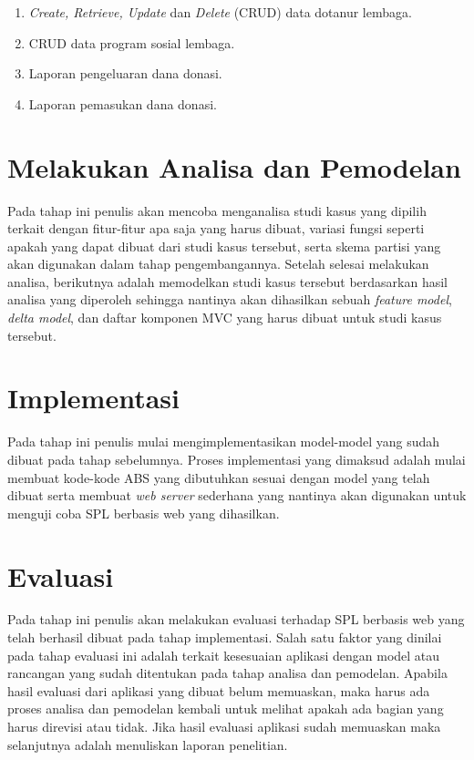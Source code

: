 \begin{enumerate}
    \item \textit{Create, Retrieve, Update} dan \textit{Delete} (CRUD) data dotanur lembaga.
    \item CRUD data program sosial lembaga.
    \item Laporan pengeluaran dana donasi.
    \item Laporan pemasukan dana donasi.
\end{enumerate} 

\section{Melakukan Analisa dan Pemodelan}
Pada tahap ini penulis akan mencoba menganalisa studi kasus yang dipilih terkait dengan fitur-fitur apa saja yang harus dibuat, variasi fungsi seperti apakah yang dapat dibuat dari studi kasus tersebut, serta skema partisi yang akan digunakan dalam tahap pengembangannya. Setelah selesai melakukan analisa, berikutnya adalah memodelkan studi kasus tersebut berdasarkan hasil analisa yang diperoleh sehingga nantinya akan dihasilkan sebuah \textit{feature model}, \textit{delta model}, dan daftar komponen MVC yang harus dibuat untuk studi kasus tersebut.

\section{Implementasi}
Pada tahap ini penulis mulai mengimplementasikan model-model yang sudah dibuat pada tahap sebelumnya. Proses implementasi yang dimaksud adalah mulai membuat kode-kode ABS yang dibutuhkan sesuai dengan model yang telah dibuat serta membuat \textit{web server} sederhana yang nantinya akan digunakan untuk menguji coba SPL berbasis web yang dihasilkan.

\section{Evaluasi}
Pada tahap ini penulis akan melakukan evaluasi terhadap SPL berbasis web yang telah berhasil dibuat pada tahap implementasi. Salah satu faktor yang dinilai pada tahap evaluasi ini adalah terkait kesesuaian aplikasi dengan model atau rancangan yang sudah ditentukan pada tahap analisa dan pemodelan. Apabila hasil evaluasi dari aplikasi yang dibuat belum memuaskan, maka harus ada proses analisa dan pemodelan kembali untuk melihat apakah ada bagian yang harus direvisi atau tidak. Jika hasil evaluasi aplikasi sudah memuaskan maka selanjutnya adalah menuliskan laporan penelitian. \\

